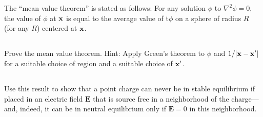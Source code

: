 \documentclass[11pt]{article}
\renewcommand{\vec}[1]{\mathbf{#1}}
\newenvironment{statement}[1]
{
	\section{#1}
	\color{darkgray}
	\ignorespaces
}
{
}
\newenvironment{problem}
{
	\subsection{}
	\color{darkgray}
    \ignorespaces
}
{

}
\begin{document}
\newcommand{\lap}{\nabla^2}
\newcommand{\vE}{\vec{E}}

\begin{statement}{}
	The ``mean value theorem'' is stated as follows: For any solution $\phi$ to $\lap \phi = 0$, the value of $\phi$ at $\vx$ is equal to the average value of t$\phi$ on a sphere of radius $R$ (for any $R$) centered at $\vx$.
\end{statement}

\begin{problem}
	Prove the mean value theorem.  Hint: Apply Green's theorem to $\phi$ and $1/\abs{\vx - \vx'}$ for a suitable choice of region and a suitable choice of $\vx'$.
\end{problem}

\begin{problem}
	Use this result to show that a point charge can never be in stable equilibrium if placed in an electric field $\vE$ that is source free in a neighborhood of the charge---and, indeed, it can be in neutral equilibrium only if $\vE = 0$ in this neighborhood.
\end{problem}

\end{document}
